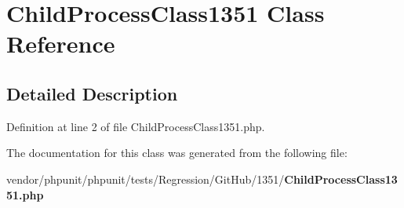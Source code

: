 \section{Child\+Process\+Class1351 Class Reference}
\label{class_child_process_class1351}


\subsection{Detailed Description}


Definition at line 2 of file Child\+Process\+Class1351.\+php.



The documentation for this class was generated from the following file\+:\begin{DoxyCompactItemize}
\item 
vendor/phpunit/phpunit/tests/\+Regression/\+Git\+Hub/1351/{\bf Child\+Process\+Class1351.\+php}\end{DoxyCompactItemize}
